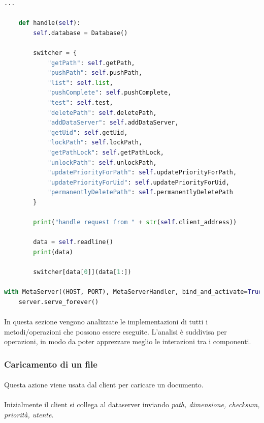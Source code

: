 \documentclass{article}
\begin{document}
\begin{lstlisting}[language=Python, title=Metaserver e relativo handler]
    ...
    
    def handle(self):
        self.database = Database()

        switcher = {
            "getPath": self.getPath,
            "pushPath": self.pushPath,
            "list": self.list,
            "pushComplete": self.pushComplete,
            "test": self.test,
            "deletePath": self.deletePath,
            "addDataServer": self.addDataServer,
            "getUid": self.getUid,
            "lockPath": self.lockPath,
            "getPathLock": self.getPathLock,
            "unlockPath": self.unlockPath,
            "updatePriorityForPath": self.updatePriorityForPath,
            "updatePriorityForUid": self.updatePriorityForUid,
            "permanentlyDeletePath": self.permanentlyDeletePath
        }

        print("handle request from " + str(self.client_address))

        data = self.readline()
        print(data)

        switcher[data[0]](data[1:])

with MetaServer((HOST, PORT), MetaServerHandler, bind_and_activate=True) as server:
    server.serve_forever()
\end{lstlisting}

\paragraph{} In questa sezione vengono analizzate le implementazioni di tutti i metodi/operazioni che possono essere eseguite. L'analisi è suddivisa per operazioni, in modo da poter apprezzare meglio le interazioni tra i componenti. 

\subsubsection{Caricamento di un file}

\paragraph{} Questa azione viene usata dal client per caricare un documento.

\paragraph{} Inizialmente il client si collega al dataserver inviando \emph{path, dimensione, checksum, priorità, utente}.
\end{document}
